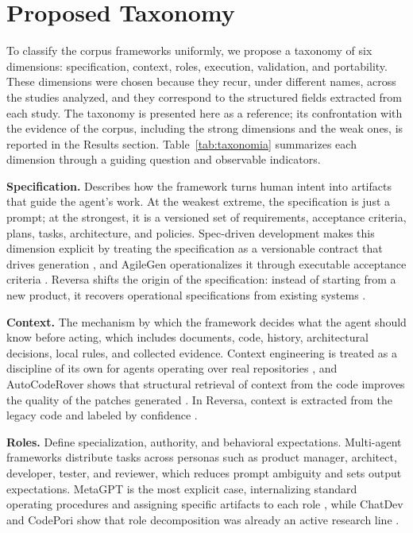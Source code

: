 \section{Proposed Taxonomy}

To classify the corpus frameworks uniformly, we propose a taxonomy of six dimensions: specification, context, roles, execution, validation, and portability. These dimensions were chosen because they recur, under different names, across the studies analyzed, and they correspond to the structured fields extracted from each study. The taxonomy is presented here as a reference; its confrontation with the evidence of the corpus, including the strong dimensions and the weak ones, is reported in the Results section. Table~\ref{tab:taxonomia} summarizes each dimension through a guiding question and observable indicators.

\noindent\textbf{Specification.} Describes how the framework turns human intent into artifacts that guide the agent's work. At the weakest extreme, the specification is just a prompt; at the strongest, it is a versioned set of requirements, acceptance criteria, plans, tasks, architecture, and policies. Spec-driven development makes this dimension explicit by treating the specification as a versionable contract that drives generation \cite{DeepakBabuPiskala2026}, and AgileGen operationalizes it through executable acceptance criteria \cite{SaiZhang2025}. Reversa shifts the origin of the specification: instead of starting from a new product, it recovers operational specifications from existing systems \cite{Macedo2026}.

\noindent\textbf{Context.} The mechanism by which the framework decides what the agent should know before acting, which includes documents, code, history, architectural decisions, local rules, and collected evidence. Context engineering is treated as a discipline of its own for agents operating over real repositories \cite{SeyedmoeinMohsenimofidi2025}, and AutoCodeRover shows that structural retrieval of context from the code improves the quality of the patches generated \cite{YuntongZhang2024}. In Reversa, context is extracted from the legacy code and labeled by confidence \cite{Macedo2026}.

\noindent\textbf{Roles.} Define specialization, authority, and behavioral expectations. Multi-agent frameworks distribute tasks across personas such as product manager, architect, developer, tester, and reviewer, which reduces prompt ambiguity and sets output expectations. MetaGPT is the most explicit case, internalizing standard operating procedures and assigning specific artifacts to each role \cite{SiruiHong2023}, while ChatDev and CodePori show that role decomposition was already an active research line \cite{ChenQian2023,ZeeshanRasheed2024}.

